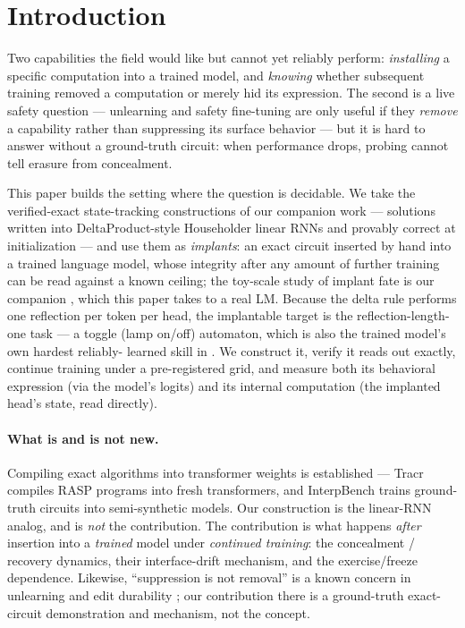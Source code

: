 \documentclass[10pt]{article}
\begin{document}
\section{Introduction}
Two capabilities the field would like but cannot yet reliably perform: \emph{installing} a specific
computation into a trained model, and \emph{knowing} whether subsequent training removed a computation
or merely hid its expression. The second is a live safety question --- unlearning and safety
fine-tuning are only useful if they \emph{remove} a capability rather than suppressing its surface
behavior \citep{lynch2024eight} --- but it is hard to answer without a ground-truth circuit: when
performance drops, probing cannot tell erasure from concealment.

This paper builds the setting where the question is decidable. We take the verified-exact
state-tracking constructions of our companion work \citep{howe2026automaton} --- solutions written
into DeltaProduct-style Householder linear RNNs and provably correct at initialization --- and use
them as \emph{implants}: an exact circuit inserted by hand into a trained language model, whose
integrity after any amount of further training can be read against a known ceiling; the toy-scale study
of implant fate is our companion \citep{howe2026implant}, which this paper takes to a real LM. Because the delta
rule performs one reflection per token per head, the implantable target is the reflection-length-one
task --- a toggle (lamp on/off) automaton, which is also the trained model's own hardest reliably-%
learned skill in \citet{howe2026hygiene}. We construct it, verify it reads out exactly, continue
training under a pre-registered grid, and measure both its behavioral expression (via the model's
logits) and its internal computation (the implanted head's state, read directly).

\paragraph{What is and is not new.} Compiling exact algorithms into transformer weights is established
--- Tracr \citep{lindner2023tracr} compiles RASP programs into fresh transformers, and InterpBench
\citep{gupta2024interpbench} trains ground-truth circuits into semi-synthetic models. Our construction
is the linear-RNN analog, and is \emph{not} the contribution. The contribution is what happens
\emph{after} insertion into a \emph{trained} model under \emph{continued training}: the concealment /
recovery dynamics, their interface-drift mechanism, and the exercise/freeze dependence. Likewise,
``suppression is not removal'' is a known concern in unlearning \citep{lynch2024eight} and edit
durability \citep{cheng2025erase}; our contribution there is a ground-truth exact-circuit
demonstration and mechanism, not the concept.
\end{document}
